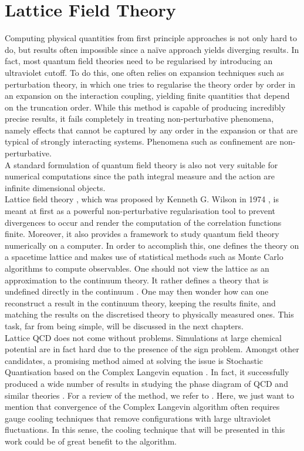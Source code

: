 \section{Lattice Field Theory}
Computing physical quantities from first principle approaches is not only hard to do, but results often impossible since a na\"ive approach yields diverging results. In fact, most quantum field theories need to be regularised by introducing an ultraviolet cutoff. To do this, one often relies on expansion techniques such as perturbation theory, in which one tries to regularise the theory order by order in an expansion on the interaction coupling, yielding finite quantities that depend on the truncation order.  While this method is capable of producing incredibly precise results, it fails completely in treating non-perturbative phenomena, namely effects that cannot be captured by any order in the expansion or that are typical of strongly interacting systems.
Phenomena such as confinement are non-perturbative.\\
A standard formulation of quantum field theory is also not very suitable for numerical computations since the path integral measure and the action are infinite dimensional objects. \\
Lattice field theory \cite{Montvay1994QuantumLattice,rothe_LGT,gattringer_LQCD,creutz_2023}, which was proposed by Kenneth G. Wilson in 1974 \cite{wilson_lqcd}, is meant at first as a powerful non-perturbative regularisation tool to prevent divergences to occur and render the computation of the correlation functions finite. Moreover, it also provides a framework to study quantum field theory numerically on a computer. In order to accomplish this, one defines the theory on a spacetime lattice and makes use of statistical methods such as Monte Carlo algorithms to compute observables. 
One should not view the lattice as an approximation to the continuum theory. It rather defines a theory that is undefined directly in the continuum \cite{Wiese:2009qsa}. One may then wonder how can one reconstruct a result in the continuum theory, keeping the results finite, and matching the results on the discretised theory to physically measured ones. This task, far from being simple, will be  discussed in the next chapters.\\
Lattice QCD does not come without problems. Simulations at large chemical potential are in fact hard due to the presence of the sign problem. Amongst other candidates, a promising method aimed at solving the issue is Stochastic Quantisation based on the Complex Langevin equation \cite{Gert_Aarts_2008,Berger_2021,Seiler_2018_status,Aarts_2010}. In fact, it successfully produced a wide number of results in studying the phase diagram of QCD and similar theories \cite{attanasio,Attanasio_2020,langelage2013onset,sinclair2016complex,Sexty_2014}. For a review of the method, we refer to \cite{Aarts_2016,Aarts_2013}. Here, we just want to mention that convergence of the Complex Langevin algorithm often requires gauge cooling techniques \cite{gaugecool} that remove configurations with large ultraviolet fluctuations. 
In this sense, the cooling technique that will be presented in this work could be of great benefit to the algorithm.

